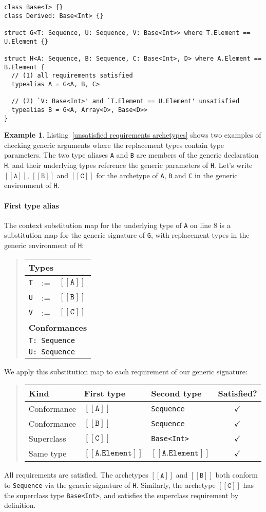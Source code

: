 \documentclass[a4paper,headsepline,bibliography=totoc,toc=flat,fleqn,twoside=semi]{scrbook}
\theoremstyle{definition}
\theoremstyle{definition}
\newtheorem{example}{Example}[chapter]
\theoremstyle{definition}
\newcommand{\SubMapC}[2]{\begin{tabular}{|lll|}
\hline
\multicolumn{3}{|l|}{\textbf{Types}}\\
\hline
#1\\
\hline
\hline
\multicolumn{3}{|l|}{\textbf{Conformances}}\\
\hline
#2\\
\hline
\end{tabular}}
\newcommand{\SubConf}[1]{\multicolumn{3}{|l|}{\texttt{#1}}}
\newcommand{\archetype}[1]{$[\![\texttt{#1}]\!]$}
\begin{document}
\begin{listing}\label{unsatisfied requirements archetypes}
\begin{Verbatim}
class Base<T> {}
class Derived: Base<Int> {}

struct G<T: Sequence, U: Sequence, V: Base<Int>> where T.Element == U.Element {}

struct H<A: Sequence, B: Sequence, C: Base<Int>, D> where A.Element == B.Element {
  // (1) all requirements satisfied
  typealias A = G<A, B, C>

  // (2) `V: Base<Int>' and `T.Element == U.Element' unsatisfied
  typealias B = G<A, Array<D>, Base<D>>
}
\end{Verbatim}
\end{listing}
\begin{example}
Listing~\ref{unsatisfied requirements archetypes} shows two examples of checking generic arguments where the replacement types contain type parameters. The two type aliases \texttt{A} and \texttt{B} are members of the generic declaration \texttt{H}, and their underlying types reference the generic parameters of \texttt{H}. Let's write \archetype{A}, \archetype{B} and \archetype{C} for the archetype of \texttt{A}, \texttt{B} and \texttt{C} in the generic environment of \texttt{H}.

\paragraph{First type alias} The context substitution map for the underlying type of \texttt{A} on line 8 is a substitution map for the generic signature of \texttt{G}, with replacement types in the generic environment of \texttt{H}:
\begin{quote}
\SubMapC{
\texttt{T}&:=&\archetype{A}\\
\texttt{U}&:=&\archetype{B}\\
\texttt{V}&:=&\archetype{C}
}{
\SubConf{T:\ Sequence}\\
\SubConf{U:\ Sequence}
}
\end{quote}
We apply this substitution map to each requirement of our generic signature:
\begin{quote}
\begin{tabular}{|l|l|l|c|}
\hline
Kind&First type&Second type&Satisfied?\\
\hline
Conformance&\archetype{A}&\texttt{Sequence}&$\checkmark$\\
Conformance&\archetype{B}&\texttt{Sequence}&$\checkmark$\\
Superclass&\archetype{C}&\texttt{Base<Int>}&$\checkmark$\\
Same type&\archetype{A.Element}&\archetype{A.Element}&$\checkmark$\\
\hline
\end{tabular}
\end{quote}
All requirements are satisfied. The archetypes \archetype{A} and \archetype{B} both conform to \texttt{Sequence} via the generic signature of \texttt{H}. Similarly, the archetype \archetype{C} has the superclass type \texttt{Base<Int>}, and satisfies the superclass requirement by definition.


\end{example}
\end{document}
